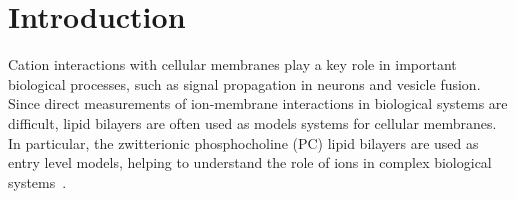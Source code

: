 \documentclass[aip,jcp,twocolumn]{revtex4}
\begin{document}
\maketitle %



\section{Introduction}
Cation interactions with cellular membranes play a key role in important biological processes,
such as signal propagation in neurons and vesicle fusion.
Since direct measurements of ion-membrane interactions in biological systems
are difficult, lipid bilayers are often used as models systems for cellular
membranes. In particular, the zwitterionic phosphocholine (PC) lipid bilayers are
used as entry level models, helping to understand the role of ions in complex biological
systems~\cite{scherer87,seelig90,cevc90}.
\end{document}
